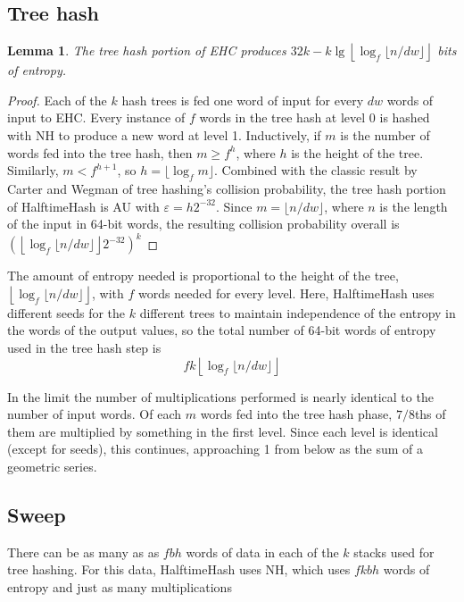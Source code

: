 \documentclass[sigconf, nonacm]{acmart}
\newtheorem*{lemma}{Lemma}
\begin{document}
\subsection{Tree hash}

\begin{lemma}
The tree hash portion of EHC produces $32k - k\lg\left\lfloor\log_f \lfloor n/d w\rfloor\right\rfloor$ bits of entropy.
\end{lemma}
\begin{proof}
Each of the $k$ hash trees is fed one word of input for every $d w$ words of input to EHC.
Every instance of $f$ words in the tree hash at level 0 is hashed with NH to produce a new word at level 1.
Inductively, if $m$ is the number of words fed into the tree hash, then $m \geq f^h$, where $h$ is the height of the tree.
Similarly, $m < f^{h+1}$, so $h = \lfloor \log_f m \rfloor$.
Combined with the classic result by Carter and Wegman of tree hashing's collision probability, the tree hash portion of HalftimeHash is AU with $\varepsilon = h 2^{-32}$.
Since $m = \lfloor n / d w \rfloor$, where $n$ is the length of the input in 64-bit words, the resulting collision probability overall is $\left(\left\lfloor \log_f \lfloor n / d w \rfloor \right\rfloor 2^{-32}\right)^k$
\end{proof}

The amount of entropy needed is proportional to the height of the tree, $\left\lfloor\log_f \lfloor n/d w\rfloor\right\rfloor$, with $f$ words needed for every level.
Here, HalftimeHash uses different seeds for the $k$ different trees to maintain independence of the entropy in the words of the output values, so the total number of 64-bit words of entropy used in the tree hash step is \[f k\left\lfloor\log_f \lfloor n/d w\rfloor\right\rfloor\]

In the limit the number of multiplications performed is nearly identical to the number of input words.
Of each $m$ words fed into the tree hash phase, $7/8$ths of them are multiplied by something in the first level.
Since each level is identical (except for seeds), this continues, approaching 1 from below as the sum of a geometric series.

\subsection{Sweep}

There can be as many as as $f b h$ words of data in each of the $k$ stacks used for tree hashing.
For this data, HalftimeHash uses NH, which uses $f k b h$ words of entropy and just as many multiplications
\end{document}
